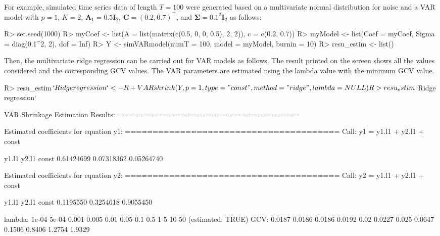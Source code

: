 \documentclass[
]{jss}
\begin{document}
For example, simulated time series data of length \(T=100\) were
generated based on a multivariate normal distribution for noise and a
VAR model with \(p=1\), \(K=2\), \(\mathbf{A}_1 = 0.5\mathbf{I}_2\),
\(\mathbf{C}=(0.2, 0.7)^\top\), and
\(\mathbf{\Sigma} = 0.1^2\mathbf{I}_2\) as follows:

\begin{CodeChunk}

\begin{CodeInput}
R> set.seed(1000)
R> myCoef <- list(A = list(matrix(c(0.5, 0, 0, 0.5), 2, 2)), c = c(0.2, 0.7))
R> myModel <- list(Coef = myCoef, Sigma = diag(0.1^2, 2), dof = Inf)
R> Y <- simVARmodel(numT = 100, model = myModel, burnin = 10)
R> resu_estim <- list()
\end{CodeInput}
\end{CodeChunk}

Then, the multivariate ridge regression can be carried out for VAR
models as follows. The result printed on the screen shows all the
 values considered and the corresponding GCV values. The
VAR parameters are estimated using the lambda value with the minimum GCV
value.

\begin{CodeChunk}

\begin{CodeInput}
R> resu_estim$`Ridge regression` <-
R+   VARshrink(Y, p = 1, type = "const", method = "ridge", lambda = NULL)
R> resu_estim$`Ridge regression`
\end{CodeInput}

\begin{CodeOutput}

VAR Shrinkage Estimation Results:
================================= 

Estimated coefficients for equation y1: 
======================================= 
Call:
y1 = y1.l1 + y2.l1 + const 

     y1.l1      y2.l1      const 
0.61424699 0.07318362 0.05264740 


Estimated coefficients for equation y2: 
======================================= 
Call:
y2 = y1.l1 + y2.l1 + const 

    y1.l1     y2.l1     const 
0.1195550 0.3254618 0.9055450 


lambda: 1e-04 5e-04 0.001 0.005 0.01 0.05 0.1 0.5 1 5 10 50 (estimated: TRUE) 
GCV:  0.0187 0.0186 0.0186 0.0192 0.02 0.0227 0.025 0.0647 0.1506 0.8406 1.2754 1.9329 
\end{CodeOutput}
\end{CodeChunk}
\end{document}
